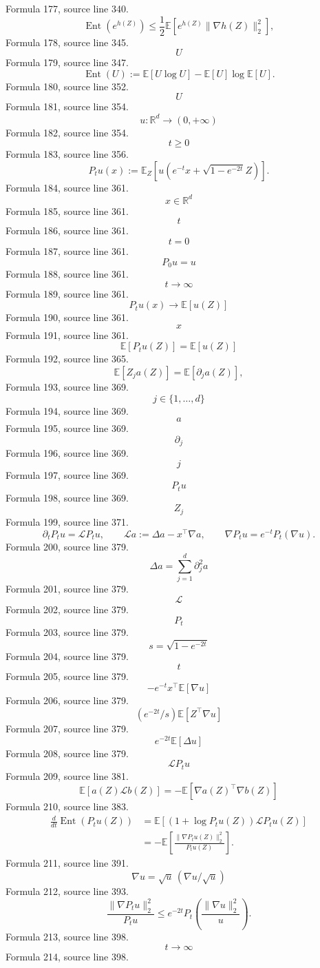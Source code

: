 \documentclass{ctexart}
\begin{document}
Formula 177, source line 340.
\[
\operatorname{Ent}(e^{h(Z)})
\leq\frac12\mathbb E\left[e^{h(Z)}\|\nabla h(Z)\|_2^2\right],
\]
Formula 178, source line 345.
\[U\]
Formula 179, source line 347.
\[
\operatorname{Ent}(U)
:=\mathbb E[U\log U]-\mathbb E[U]\log\mathbb E[U].
\]
Formula 180, source line 352.
\[U\]
Formula 181, source line 354.
\[u:\mathbb R^d\to(0,+\infty)\]
Formula 182, source line 354.
\[t\geq0\]
Formula 183, source line 356.
\[
P_tu(x)
:=\mathbb E_Z\left[u\left(e^{-t}x+\sqrt{1-e^{-2t}}Z\right)\right].
\]
Formula 184, source line 361.
\[x\in\mathbb R^d\]
Formula 185, source line 361.
\[t\]
Formula 186, source line 361.
\[t=0\]
Formula 187, source line 361.
\[P_0u=u\]
Formula 188, source line 361.
\[t\to\infty\]
Formula 189, source line 361.
\[P_tu(x)\to\mathbb E[u(Z)]\]
Formula 190, source line 361.
\[x\]
Formula 191, source line 361.
\[\mathbb E[P_tu(Z)]=\mathbb E[u(Z)]\]
Formula 192, source line 365.
\[
\mathbb E[Z_j a(Z)]=\mathbb E[\partial_j a(Z)],
\]
Formula 193, source line 369.
\[j\in\{1,\ldots,d\}\]
Formula 194, source line 369.
\[a\]
Formula 195, source line 369.
\[\partial_j\]
Formula 196, source line 369.
\[j\]
Formula 197, source line 369.
\[P_tu\]
Formula 198, source line 369.
\[Z_j\]
Formula 199, source line 371.
\[
\partial_tP_tu=\mathcal L P_tu,
\qquad
\mathcal L a:=\Delta a-x^\top\nabla a,
\qquad
\nabla P_tu=e^{-t}P_t(\nabla u).
\]
Formula 200, source line 379.
\[\Delta a=\sum\limits_{j=1}^d\partial_j^2a\]
Formula 201, source line 379.
\[\mathcal L\]
Formula 202, source line 379.
\[P_t\]
Formula 203, source line 379.
\[s=\sqrt{1-e^{-2t}}\]
Formula 204, source line 379.
\[t\]
Formula 205, source line 379.
\[-e^{-t}x^\top\mathbb E[\nabla u]\]
Formula 206, source line 379.
\[(e^{-2t}/s)\mathbb E[Z^\top\nabla u]\]
Formula 207, source line 379.
\[e^{-2t}\mathbb E[\Delta u]\]
Formula 208, source line 379.
\[\mathcal LP_tu\]
Formula 209, source line 381.
\[\mathbb E[a(Z)\mathcal Lb(Z)]=-\mathbb E[\nabla a(Z)^\top\nabla b(Z)]\]
Formula 210, source line 383.
\[
\begin{aligned}
\frac{d}{dt}\operatorname{Ent}(P_tu(Z))
&=\mathbb E\left[\left(1+\log P_tu(Z)\right)\mathcal LP_tu(Z)\right]\\
&=-\mathbb E\left[\frac{\|\nabla P_tu(Z)\|_2^2}{P_tu(Z)}\right].
\end{aligned}
\]
Formula 211, source line 391.
\[\nabla u=\sqrt u\,(\nabla u/\sqrt u)\]
Formula 212, source line 393.
\[
\frac{\|\nabla P_tu\|_2^2}{P_tu}
\leq e^{-2t}P_t\left(\frac{\|\nabla u\|_2^2}{u}\right).
\]
Formula 213, source line 398.
\[t\to\infty\]
Formula 214, source line 398.
\end{document}
